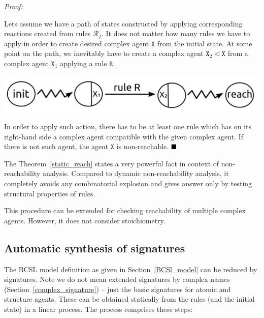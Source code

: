 \documentclass[12pt]{fithesis2}
\newenvironment{proof}{\noindent\emph{Proof:~ }\nopagebreak \begin{itshape}}{\end{itshape}\bigskip}
\newcommand*{\QEDA}{\hfill\ensuremath{\blacksquare}}%
\begin{document}
\begin{proof}
Lets assume we have a path of states constructed by applying corresponding reactions created from rules $\mathcal{R}_f$. It does not matter how many rules we have to apply in order to create desired complex agent $\mathtt{X}$ from the initial state. At some point on the path, we inevitably have to create a complex agent $\mathtt{X}_2 \lhd \mathtt{X}$ from a complex agent $\mathtt{X}_1$ applying a rule $\mathtt{R}$. 

\begin{center}
\includegraphics[scale=0.15]{pics/static_reach}
\end{center}

In order to apply such action, there has to be at least one rule which has on its right-hand side a complex agent compatible with the given complex agent. If there is not such agent, the agent $\mathtt{X}$ is non-reachable. $\QEDA$
\end{proof}

The Theorem~\ref{static_reach} states a very powerful fact in context of non-reachability analysis. Compared to dynamic non-reachability analysis, it completely avoids any combinatorial explosion and gives answer only by testing structural properties of rules.

This procedure can be extended for checking reachability of multiple complex agents. However, it does not consider stoichiometry.

\subsection{Automatic synthesis of signatures}

The BCSL model definition as given in Section~\ref{BCSl_model} can be reduced by signatures. Note we do not mean extended signatures by complex names (Section~\ref{complex_signature}) -- just the basic signatures for atomic and structure agents. These can be obtained statically from the rules (and the initial state) in a  linear process. The process comprises these steps:
\end{document}
